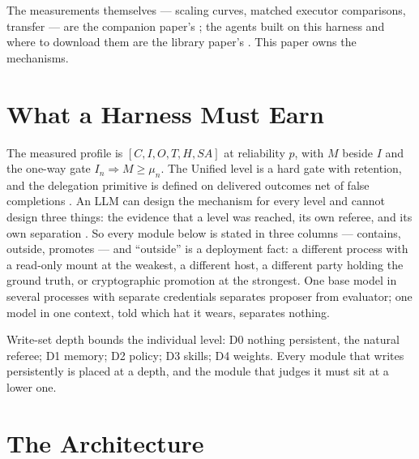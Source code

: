 The measurements themselves --- scaling curves, matched executor comparisons, transfer --- are the companion paper's \citep{yang2026scaling}; the agents built on this harness and where to download them are the library paper's \citep{yang2026library}. This paper owns the mechanisms.

\section{What a Harness Must Earn}\label{sec:requires}

The measured profile is $[C,I,O,T,H,SA]$ at reliability $p$, with $M$ beside $I$ and the one-way gate $I_n \Rightarrow M \ge \mu_n$. The Unified level is a hard gate with retention, and the delegation primitive is defined on delivered outcomes net of false completions \citep{yang2026unified}. An LLM can design the mechanism for every level and cannot design three things: the evidence that a level was reached, its own referee, and its own separation \citep{yang2026designing}. So every module below is stated in three columns --- contains, outside, promotes --- and ``outside'' is a deployment fact: a different process with a read-only mount at the weakest, a different host, a different party holding the ground truth, or cryptographic promotion at the strongest. One base model in several processes with separate credentials separates proposer from evaluator; one model in one context, told which hat it wears, separates nothing.

Write-set depth bounds the individual level: D0 nothing persistent, the natural referee; D1 memory; D2 policy; D3 skills; D4 weights. Every module that writes persistently is placed at a depth, and the module that judges it must sit at a lower one.

\section{The Architecture}\label{sec:arch}

